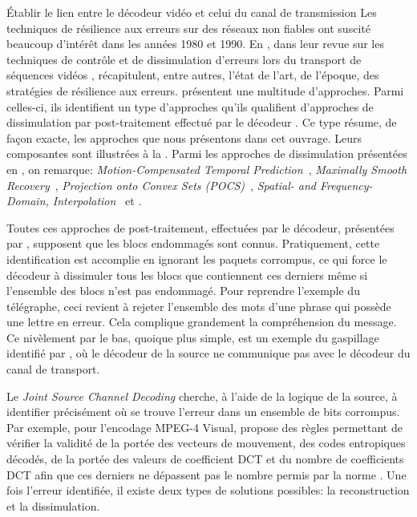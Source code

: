 \begin{section}{Établir le lien entre le décodeur vidéo et celui du canal de
transmission}
\label{sect-SourceChannel}
Les techniques de résilience aux erreurs sur des réseaux non fiables ont suscité
beaucoup d'intérêt dans les années 1980 et 1990. En \citeyear{Wang1998}, dans
leur revue sur les techniques de contrôle et de dissimulation d'erreurs lors du
transport de séquences vidéos
\citep{Wang1998}, \citeauthor{Wang1998} récapitulent, entre autres, l'état de
l'art, de l'époque, des stratégies de résilience aux erreurs.
\citeauthor{Wang1998} présentent une multitude d'approches. Parmi celles-ci, ils
identifient un type d'approches qu'ils qualifient d'approches de dissimulation
par post-traitement effectué par le décodeur \citep[Chap. 5]{Wang1998}. Ce type
résume, de façon exacte, les approches que nous présentons dans cet ouvrage.
Leurs composantes sont illustrées à la . Parmi les
approches de dissimulation présentées en \citeyear{Wang1998}, on remarque:
\textit{Motion-Compensated Temporal Prediction}~\citep{Ghanbari1993},
\textit{Maximally Smooth Recovery}~\citep{Wang1993}, \textit{Projection onto
Convex Sets (POCS)}~\citep{Sun1995}, \textit{Spatial- and Frequency-Domain,
Interpolation}~\citep{Hemami1995} et \citep{Sun1992}.

Toutes ces approches de post-traitement, effectuées par le décodeur, présentées
par \citet{Wang1998}, supposent que les blocs endommagés sont connus.
Pratiquement, cette identification est accomplie en ignorant les paquets
corrompus, ce qui force le décodeur à dissimuler tous les blocs que contiennent
ces derniers même si l'ensemble des blocs n'est pas endommagé. Pour reprendre
l'exemple du télégraphe, ceci revient à rejeter l'ensemble des mots d'une phrase
qui possède une lettre en erreur. Cela complique grandement la compréhension du
message. Ce nivèlement par le bas, quoique plus simple, est un exemple du
gaspillage identifié par \citeauthor{Modestino1979}, où le décodeur de la source
ne communique pas avec le décodeur du canal de transport.

Le \textit{Joint Source Channel Decoding} \citep{Duhamel2010} cherche, à l'aide
de la logique de la source, à identifier précisément où se trouve l'erreur dans
un ensemble de bits corrompus. Par exemple, pour l'encodage MPEG-4 Visual,
\citeauthor{Talluri1998} propose des règles permettant de vérifier la validité
de la portée des vecteurs de mouvement, des codes entropiques décodés, de la
portée des valeurs de coefficient DCT et du nombre de coefficients DCT afin que
ces derniers ne dépassent pas le nombre permis par la norme \citep{Talluri1998}.
Une fois l'erreur identifiée, il existe deux types de solutions possibles: la
reconstruction et la dissimulation.


\end{section}
